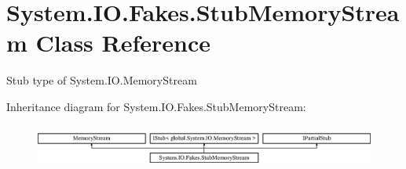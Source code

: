 \hypertarget{class_system_1_1_i_o_1_1_fakes_1_1_stub_memory_stream}{\section{System.\-I\-O.\-Fakes.\-Stub\-Memory\-Stream Class Reference}
\label{class_system_1_1_i_o_1_1_fakes_1_1_stub_memory_stream}
}


Stub type of System.\-I\-O.\-Memory\-Stream 


Inheritance diagram for System.\-I\-O.\-Fakes.\-Stub\-Memory\-Stream\-:\begin{figure}[H]
\begin{center}
\leavevmode
\includegraphics[height=1.458333cm]{class_system_1_1_i_o_1_1_fakes_1_1_stub_memory_stream}
\end{center}
\end{figure}
